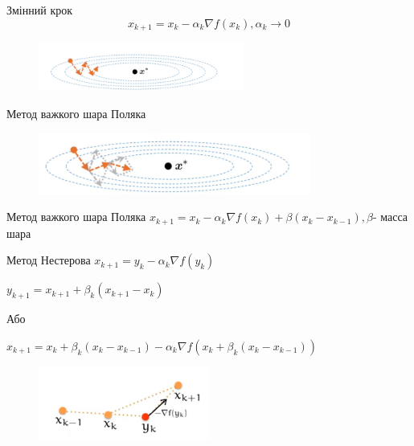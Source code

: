 \documentclass[a4paper, 14pt]{beamer}
\begin{document}
\begin{frame}{Змінний крок}
    $$x_{k+1} = x_k - \alpha_k \nabla f(x_k), \alpha_k \rightarrow 0$$
    \begin{figure}
        \includegraphics[width = 0.6\textwidth]{imgs/gradient.png}
    \end{figure}
\end{frame}

\begin{frame}{Метод важкого шара Поляка}
    \begin{figure}
        \includegraphics[width = 0.8\textwidth]{imgs/polyak.png}
    \end{figure}
\end{frame}

\begin{frame}{Метод важкого шара Поляка}
    $x_{k + 1} = x_k - \alpha_k \nabla f(x_k) + \beta (x_k - x_{k-1}), 
    \beta $- масса шара 
\end{frame}


\begin{frame}{Метод Нестерова}
    $x_{k + 1} = y_k - \alpha_k \nabla f(y_k) $


    $y_{k+1} = x_{k+1} + \beta_k (x_{k+1} - x_k)$


    Або 
    

    $x_{k+1} = x_k + \beta_k (x_k - x_{k -1}) - \alpha_k 
    \nabla f(x_k + \beta_k (x_k - x_{k - 1}))$ 
    \begin{figure}
        \includegraphics[width = 0.5\textwidth]{imgs/nesterov.png}
    \end{figure}
\end{frame}
\end{document}
